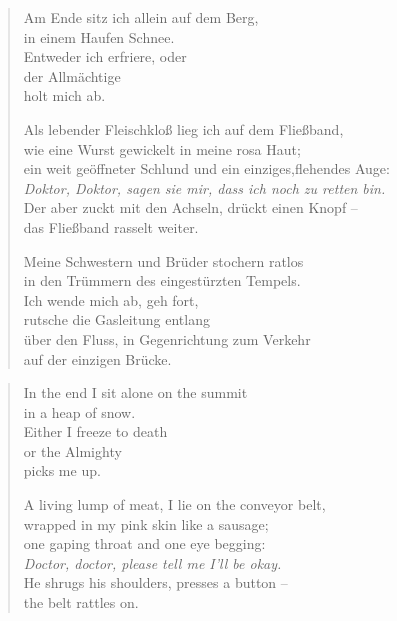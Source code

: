 
{\setlength{\vleftmargin}{1.5em}

\cleartoverso


\begin{verse}
Am Ende sitz ich allein auf dem Berg,\\
in einem Haufen Schnee.\\
Entweder ich erfriere, oder\\
der Allmächtige\\
holt mich ab.

\rhytmbreak

Als lebender Fleischkloß lieg ich auf dem Fließband,\\
wie eine Wurst gewickelt in meine rosa Haut;\\
ein weit geöffneter Schlund und ein einziges,\verselinebreak flehendes Auge:\\
\emph{Doktor, Doktor, sagen sie mir, dass ich noch zu retten bin.}\\
Der aber zuckt mit den Achseln, drückt einen Knopf --\\
das Fließband rasselt weiter.

\rhytmbreak

Meine Schwestern und Brüder stochern ratlos\\
in den Trümmern des eingestürzten Tempels.\\
Ich wende mich ab, geh fort,\\
rutsche die Gasleitung entlang\\
über den Fluss, in Gegenrichtung zum Verkehr\\
auf der einzigen Brücke.

\end{verse}

\clearpage


\begin{verse}
In the end I sit alone on the summit\\
in a heap of snow.\\
Either I freeze to death\\
or the Almighty\\
picks me up.

\rhytmbreak

A living lump of meat, I lie on the conveyor belt,\\
wrapped in my pink skin like a sausage;\\
one gaping throat and one eye begging:\\
\emph{Doctor, doctor, please tell me I'll be okay.}\\
He shrugs his shoulders, presses a button --\\
the belt rattles on.


\end{verse}}

